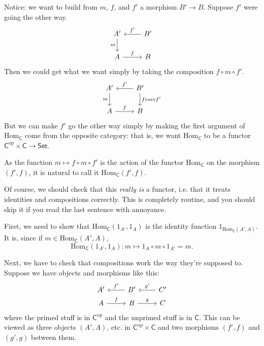\documentclass[a4paper]{report}
\newcommand{\Hom}{\mathrm{Hom}}
\theoremstyle{definition}
\theoremstyle{plain}
\theoremstyle{remark}
\begin{document}
Notice: we want to build from $m$, $f$, and $f'$ a morphism $B' \to B$. Suppose $f'$ were going the other way.
\begin{equation*}
  \begin{tikzcd}
    A' 
    \arrow[d, swap, "m"]
    & B'
    \arrow[l, swap, "f'"]
    \\
    A
    \arrow[r, "f"]
    & B
  \end{tikzcd}
\end{equation*}
Then we could get what we want simply by taking the composition $f \circ m \circ f'$.
\begin{equation*}
  \begin{tikzcd}
    A' 
    \arrow[d, swap, "m"]
    & B'
    \arrow[l, swap, "f'"]
    \arrow[d, "f \circ m \circ f'"]
    \\
    A
    \arrow[r, "f"]
    & B
  \end{tikzcd}
\end{equation*}
But we can make $f'$ go the other way simply by making the first argument of $\Hom_{\mathsf{C}}$ come from the opposite category: that is, we want $\Hom_{\mathsf{C}}$ to be a functor $\mathsf{C}^{\text{op}} \times \mathsf{C} \to \mathsf{Set}$.

As the function $m \mapsto f \circ m \circ f'$ is the action of the functor $\Hom_{\mathsf{C}}$ on the morphism $(f', f)$, it is natural to call it $\mathrm{Hom}_{\mathsf{C}}(f', f)$.

Of course, we should check that this \emph{really is} a functor, i.e. that it treats identities and compositions correctly. This is completely routine, and you should skip it if you read the last sentence with annoyance. 

First, we need to show that $\Hom_{\mathsf{C}}(1_{A'}, 1_{A})$ is the identity function $1_{\Hom_{\mathsf{C}}(A', A)}$. It is, since if $m \in \Hom_{\mathsf{C}}(A', A)$,
\begin{equation*}
  \Hom_{\mathsf{C}}(1_{A'}, 1_{A})\colon m \mapsto 1_{A} \circ m \circ 1_{A'} = m.
\end{equation*}

Next, we have to check that compositions work the way they're supposed to. Suppose we have objects and morphisms like this:
\begin{equation*}
  \begin{tikzcd}[row sep=tiny]
    A'
    & B'
    \arrow[l, swap, "f'"]
    & C'
    \arrow[l, swap, "g'"]
    \\
    A
    \arrow[r, "f"]
    & B
    \arrow[r, "g"]
    & C
  \end{tikzcd}
\end{equation*}
where the primed stuff is in $\mathsf{C}^{\mathrm{op}}$ and the unprimed stuff is in $\mathsf{C}$. This can be viewed as three objects $(A', A)$, etc. in $\mathsf{C}^{\mathrm{op}} \times \mathsf{C}$ and two morphisms  $(f', f)$ and $(g', g)$ between them.
\end{document}
